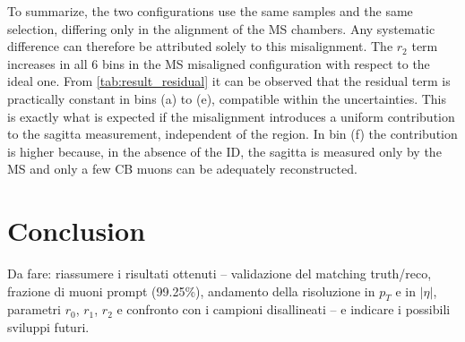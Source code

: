 \documentclass[11pt,a4paper,twoside,openright]{report}
\newif\ifshowtodos
\newenvironment{todo}[1][Nota di Luca]
  {\ifshowtodos\begin{todobox}[#1]\else\setbox0\vbox\bgroup\fi}
  {\ifshowtodos\end{todobox}\else\egroup\fi}
\begin{document}
\noindent To summarize, the two configurations use the same samples and the same selection, differing only in the alignment of the MS chambers. Any systematic difference can therefore be attributed solely to this misalignment. The $r_2$ term increases in all 6 bins in the MS misaligned configuration with respect to the ideal one. From \cref{tab:result_residual} it can be observed that the residual term is practically constant in bins (a) to (e), compatible within the uncertainties. This is exactly what is expected if the misalignment introduces a uniform contribution to the sagitta measurement, independent of the region. In bin (f) the contribution is higher because, in the absence of the ID, the sagitta is measured only by the MS and only a few CB muons can be adequately reconstructed.


\chapter{Conclusion}

\begin{todo}[Conclusioni da scrivere]
Da fare: riassumere i risultati ottenuti -- validazione del matching truth/reco,
frazione di muoni prompt (99.25\%), andamento della risoluzione in \(p_T\) e in
\(|\eta|\), parametri \(r_0\), \(r_1\), \(r_2\) e confronto con i campioni disallineati --
e indicare i possibili sviluppi futuri.
\end{todo}



\end{document}
